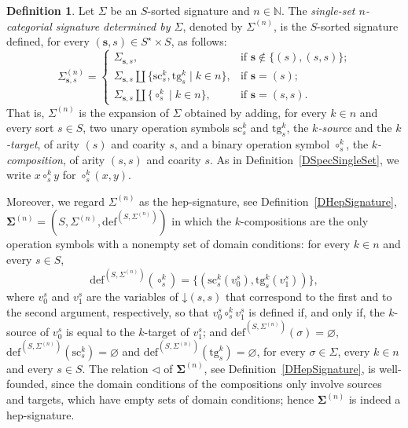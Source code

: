 \documentclass[a4paper, reqno
]{amsart}
\newcommand{\vs}[1]{\mathbin{\downarrow}#1}
\newcommand{\sig}[1]{\mathbf{#1}}             %
\newcommand{\src}{\mathrm{sc}}
\newcommand{\tgt}{\mathrm{tg}}
\theoremstyle{plain}
\theoremstyle{definition}
\newtheorem{definition}[theorem]{Definition}
\begin{document}
\begin{definition}\label{DSigmaCatSingleSet}
Let $\Sigma$ be an $S$-sorted signature and $n\in\mathbb{N}$.
The \emph{single-set $n$-categorial signature determined by $\Sigma$}, denoted by $\Sigma^{(n)}$, is the $S$-sorted signature defined, for every $(\mathbf{s},s)\in S^{\star}\times S$, as follows:
$$
{\Sigma}^{(n)}_{\mathbf{s},s}=
\begin{cases}
{\Sigma}_{\mathbf{s},s},
& \text{if $\mathbf{s}\not\in \{(s),(s,s)\}$;}\\
{\Sigma}_{\mathbf{s},s}\amalg\{\src^{k}_{s}, \tgt^{k}_{s}\mid k\in n\},
& \text{if $\mathbf{s}= (s)$;}\\
{\Sigma}_{\mathbf{s},s}\amalg\{\circ^{k}_{s}\mid k\in n\},
& \text{if $\mathbf{s}= (s,s)$.}
\end{cases}
$$
That is, ${\Sigma}^{(n)}$ is the expansion of $\Sigma$ obtained by adding, for every $k\in n$ and every sort $s\in S$, two unary operation symbols $\src^{k}_{s}$ and $\tgt^{k}_{s}$, the \emph{$k$-source} and the \emph{$k$-target}, of arity $(s)$ and coarity $s$, and a binary operation symbol $\circ^{k}_{s}$, the \emph{$k$-composition}, of arity $(s,s)$ and coarity $s$.
As in Definition~\ref{DSpecSingleSet}, we write $x\circ^{k}_{s}y$ for $\circ^{k}_{s}(x,y)$.

Moreover, we regard $\Sigma^{(n)}$ as the hep-signature, see Definition~\ref{DHepSignature}, $\sig{\Sigma}^{(n)}=(S,\Sigma^{(n)},\mathrm{def}^{(S,\Sigma^{(n)})})$ in which the $k$-compositions are the only operation symbols with a nonempty set of domain conditions: for every $k\in n$ and every $s\in S$,
$$
\mathrm{def}^{(S,\Sigma^{(n)})}(\circ^{k}_{s})=\{(\src^{k}_{s}(v^{s}_{0}),\tgt^{k}_{s}(v^{s}_{1}))\},
$$
where $v^{s}_{0}$ and $v^{s}_{1}$ are the variables of $\vs{(s,s)}$ that correspond to the first and to the second argument, respectively, so that $v^{s}_{0}\circ^{k}_{s}v^{s}_{1}$ is defined if, and only if, the $k$-source of $v^{s}_{0}$ is equal to the $k$-target of $v^{s}_{1}$; and $\mathrm{def}^{(S,\Sigma^{(n)})}(\sigma)=\varnothing$, $\mathrm{def}^{(S,\Sigma^{(n)})}(\src^{k}_{s})=\varnothing$ and $\mathrm{def}^{(S,\Sigma^{(n)})}(\tgt^{k}_{s})=\varnothing$, for every $\sigma\in\Sigma$, every $k\in n$ and every $s\in S$.
The relation $\lhd$ of $\sig{\Sigma}^{(n)}$, see Definition~\ref{DHepSignature}, is well-founded, since the domain conditions of the compositions only involve sources and targets, which have empty sets of domain conditions; hence $\sig{\Sigma}^{(n)}$ is indeed a hep-signature.
\end{definition}
\end{document}
